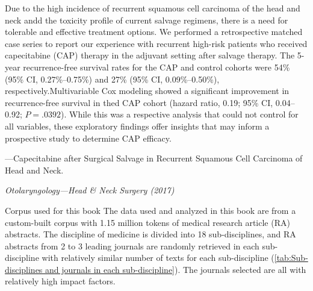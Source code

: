 \documentclass[a4paper]{ctexbook}
\begin{document}
\begin{sample}[label={myautocounter}]{\heiti}
  Due to the high incidence of recurrent squamous cell carcinoma of the head and neck andd the toxicity profile of current salvage regimens, there is a need for tolerable and effective treatment options. We performed a retrospective matched case series to report our experience with recurrent high-risk patients who received capecitabine (CAP) therapy in the adjuvant setting after salvage therapy. The 5-year recurrence-free survival rates for the CAP and control cohorts were 54\% (95\% CI, 0.27\%--0.75\%) and 27\% (95\% CI, 0.09\%--0.50\%), respectively.Multivariable Cox modeling showed a significant improvement in recurrence-free survival in thed CAP cohort (hazard ratio, 0.19; 95\% CI, 0.04--0.92; $P=.0 392$). While this was a respective analysis that could not control for all variables, these exploratory findings offer insights that may inform a prospective study to determine CAP efficacy.
  
  \begin{flushright}
    ---Capecitabine after Surgical Salvage in Recurrent Squamous Cell Carcinoma of Head and Neck. 
    
    \emph{Otolaryngology---Head \& Neck Surgery (2017)}
  \end{flushright}


\end{sample}

\begin{note}[label={myautocounter}]{\heiti Corpus used for this book}
  The data used and analyzed in this book are from a custom-built corpus with 1.15 million tokens of medical research article (RA) abstracts. The discipline of medicine is divided into 18 sub-disciplines, and RA abstracts from 2 to 3 leading journals are randomly retrieved in each sub-discipline with relatively similar number of texts for each sub-discipline (\autoref{tab:Sub-disciplines and journals in each sub-discipline}). The journals selected are all with relatively high impact factors.

\end{note}
\end{document}
